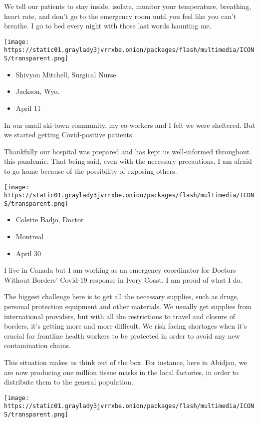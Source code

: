 We tell our patients to stay inside, isolate, monitor your temperature,
breathing, heart rate, and don't go to the emergency room until you feel
like you can't breathe. I go to bed every night with those last words
haunting me.

\texttt{[image: https://static01.graylady3jvrrxbe.onion/packages/flash/multimedia/ICONS/transparent.png]}

\begin{itemize}
\tightlist
\item
  Shivyon Mitchell, Surgical Nurse
\item
  Jackson, Wyo.
\item
  April 11
\end{itemize}

In our small ski-town community, my co-workers and I felt we were
sheltered. But we started getting Covid-positive patients.

Thankfully our hospital was prepared and has kept us well-informed
throughout this pandemic. That being said, even with the necessary
precautions, I am afraid to go home because of the possibility of
exposing others.

\texttt{[image: https://static01.graylady3jvrrxbe.onion/packages/flash/multimedia/ICONS/transparent.png]}

\begin{itemize}
\tightlist
\item
  Colette Badjo, Doctor
\item
  Montreal
\item
  April 30
\end{itemize}

I live in Canada but I am working as an emergency coordinator for
Doctors Without Borders' Covid-19 response in Ivory Coast. I am proud of
what I do.

The biggest challenge here is to get all the necessary supplies, such as
drugs, personal protection equipment and other materials. We usually get
supplies from international providers, but with all the restrictions to
travel and closure of borders, it's getting more and more difficult. We
risk facing shortages when it's crucial for frontline health workers to
be protected in order to avoid any new contamination chains.

This situation makes us think out of the box. For instance, here in
Abidjan, we are now producing one million tissue masks in the local
factories, in order to distribute them to the general population.

\texttt{[image: https://static01.graylady3jvrrxbe.onion/packages/flash/multimedia/ICONS/transparent.png]}

